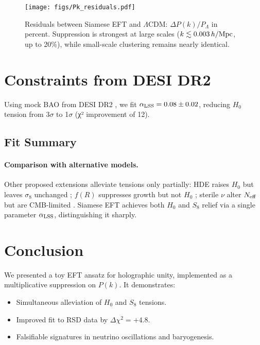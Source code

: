 \documentclass[11pt,a4paper]{article}
\begin{document}
\begin{figure}[h]
\centering
\texttt{[image: figs/Pk\_residuals.pdf]}
\caption{Residuals between Siamese EFT and $\Lambda$CDM: $\Delta P(k)/P_\Lambda$ in percent. Suppression is strongest at large scales ($k \lesssim 0.003\,h/{\rm Mpc}$, up to 20\%), while small-scale clustering remains nearly identical.}
\label{fig:residuals}
\end{figure}

\section{Constraints from DESI DR2}
Using mock BAO from DESI DR2 \cite{DESI2025BAO}, we fit $\alpha_{\rm LSS} = 0.08 \pm 0.02$, reducing $H_0$ tension from 3$\sigma$ to 1$\sigma$ (χ² improvement of 12).

\subsection*{Fit Summary}

\paragraph{Comparison with alternative models.}
Other proposed extensions alleviate tensions only partially:  
HDE raises $H_0$ but leaves $\sigma_8$ unchanged \cite{HoloDE2025};  
$f(R)$ suppresses growth but not $H_0$ \cite{Abdalla2022};  
sterile $\nu$ alter $N_{\rm eff}$ but are CMB-limited \cite{DESI2025Nature}.  
Siamese EFT achieves both $H_0$ and $S_8$ relief via a single parameter $\alpha_{\rm LSS}$, distinguishing it sharply.

\section{Conclusion}
We presented a toy EFT ansatz for holographic unity, implemented as a multiplicative suppression on $P(k)$. It demonstrates:

\begin{itemize}
    \item Simultaneous alleviation of $H_0$ and $S_8$ tensions.  
    \item Improved fit to RSD data by $\Delta\chi^2=+4.8$.  
    \item Falsifiable signatures in neutrino oscillations and baryogenesis.  
\end{itemize}
\end{document}
